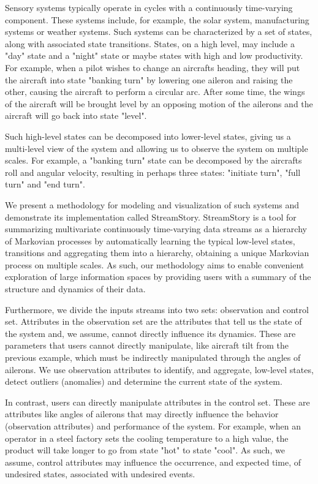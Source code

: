 Sensory systems typically operate in cycles with a continuously time-varying component. These 
systems include, for example, the solar system, manufacturing systems or weather 
systems. Such systems can be characterized by a set of states, along with associated
state transitions. States, on a high level, may include a "day" state and a "night"
state or maybe states with high and low productivity. For example, when a pilot wishes
to change an aircrafts heading, they will put the aircraft into state "banking turn"
by lowering one aileron and raising the other, causing the aircraft to perform a
circular arc. After some time, the wings of the aircraft will be brought level by
an opposing motion of the ailerons and the aircraft will go back into state "level".

Such high-level states can be decomposed into lower-level states, giving us a 
multi-level view of the system and allowing us to observe the system on multiple 
scales. For example, a "banking turn" state can be decomposed by the
aircrafts roll and angular velocity, resulting in perhaps three states: "initiate
turn", "full turn" and "end turn".

We present a methodology for modeling and visualization of such systems and demonstrate its implementation
called StreamStory. StreamStory is a tool for summarizing multivariate continuously
time-varying data streams as a hierarchy of Markovian processes by automatically learning
the typical low-level states, transitions and aggregating them into a hierarchy, obtaining
a unique Markovian process on multiple scales. As such, our methodology aims to enable
convenient exploration of large information spaces by providing users with a 
summary of the structure and dynamics of their data.

 Furthermore, we divide the inputs streams into two sets: observation and control set.
Attributes in the observation set are the attributes that tell us the state of the 
system and, we assume, cannot directly influence its dynamics. These are parameters
that users cannot directly manipulate, like aircraft tilt from the previous example,
which must be indirectly manipulated through the angles of ailerons. We use observation
attributes to identify, and aggregate, low-level states, detect outliers (anomalies) 
and determine the current state of the system.

In contrast, users can directly manipulate attributes in the control set. These 
are attributes like angles of ailerons that may directly influence the behavior 
(observation attributes) and performance of the system. For example, when an operator 
in a steel factory sets the cooling temperature to a high value, the product will
take longer to go from state "hot" to state "cool". As such, we assume, control attributes
may influence the occurrence, and expected time, of undesired states, associated with
undesired events.

